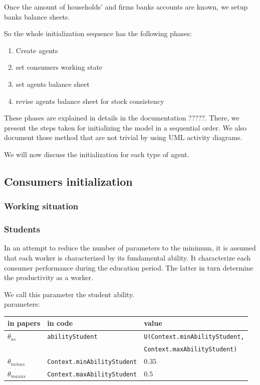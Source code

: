 \documentclass{book}
\begin{document}
Once the amount of households' and firms banks accounts are known, we setup banks balance sheets.

So the whole initialization sequence has the following phases:
\begin{enumerate}
	\item Create agents
	\item set consumers working state
	\item set agents balance sheet
	\item revise agents balance sheet for stock consistency
\end{enumerate}

These phases are explained in details in the documentation ?????. There, we present the steps taken for initializing the model in a sequential order. We also document those method that are not trivial by using UML activity diagrams.

We will now discuss the initialization for each type of agent.

\subsection{Consumers initialization}

\subsubsection{Working situation}


\subsubsection*{Students}

In an attempt to reduce the number of parameters to the minimum, it is assumed that each worker is characterized by its fundamental ability. It characterize each consumer performance during the education period. The latter in turn determine the productivity as a worker.

We call this parameter the student ability.\\
parameters:\\
\begin{tabular}{l l l}
	\hline
	in papers& in code&value\\
	\hline
	\hline
$\theta_{as}$&\verb+abilityStudent+&\verb+U(Context.minAbilityStudent,+\\
& &\verb+Context.maxAbilityStudent)+\\
 $\theta_{minas}$&\verb+Context.minAbilityStudent+&$0.35$\\
 $\theta_{maxas}$&\verb+Context.maxAbilityStudent+&$0.5$\\
	\hline
\end{tabular}
\end{document}
